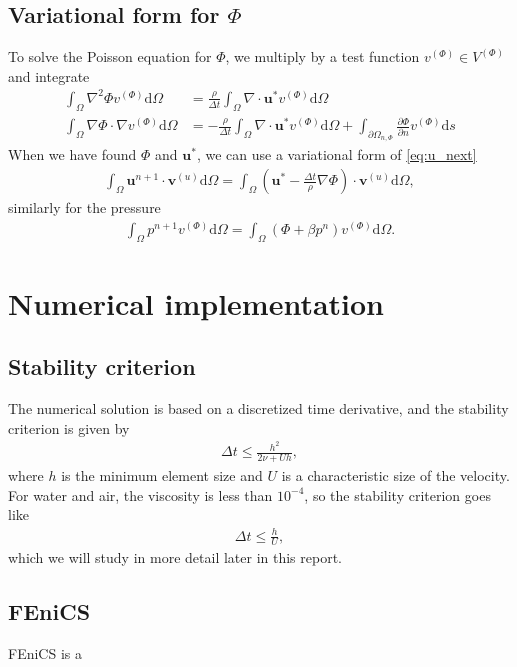 \documentclass[a4paper,10pt]{article}
\renewcommand{\vec}[1]{\mathbf{#1}}
\renewcommand{\(}{\left(}
\renewcommand{\)}{\right)}
\newcommand{\dm}[1]{\text{d}#1}
\newcommand{\dpart}[2]{\frac{\partial#1}{\partial#2}}
\begin{document}
\subsection{Variational form for $\Phi$}
To solve the Poisson equation for $\Phi$, we multiply by a test function $v^{(\Phi)} \in V^{(\Phi)}$ and integrate
\begin{align*}
  \int_\Omega \nabla^2\Phi v^{(\Phi)} \dm \Omega &= \frac{\rho}{\Delta t} \int_\Omega \nabla \cdot \vec u^* v^{(\Phi)} \dm \Omega\\
  \int_\Omega \nabla\Phi \cdot \nabla v^{(\Phi)} \dm \Omega &= -\frac{\rho}{\Delta t} \int_\Omega \nabla \cdot \vec u^* v^{(\Phi)} \dm \Omega + \int_{\partial \Omega_{n,\Phi}} \dpart{\Phi}{n}v^{(\Phi)} \dm s
\end{align*}
When we have found $\Phi$ and $\vec u^*$, we can use a variational form of \eqref{eq:u_next}
\begin{align*}
  \int_\Omega \vec u^{n+1}\cdot \vec v^{(u)} \dm \Omega = \int_\Omega (\vec u^* - \frac{\Delta t}{\rho}\nabla \Phi)\cdot \vec v^{(u)} \dm \Omega,
\end{align*}
similarly for the pressure
\begin{align*}
  \int_\Omega p^{n+1}v^{(\Phi)} \dm \Omega = \int_\Omega (\Phi + \beta p^n)v^{(\Phi)} \dm \Omega.
\end{align*}


\section{Numerical implementation}

\subsection{Stability criterion}
The numerical solution is based on a discretized time derivative, and the stability criterion is given by \cite{ns_numerical_solutions}
\begin{align*}
  \Delta t \leq \frac{h^2}{2\nu + Uh},
\end{align*}
where $h$ is the minimum element size and $U$ is a characteristic size of the velocity. For water and air, the viscosity is less than $10^{-4}$, so the stability criterion goes like
\begin{align*}
  \Delta t \leq \frac{h}{U},
\end{align*}
which we will study in more detail later in this report.

\subsection{FEniCS}
FEniCS is a 
\end{document}

